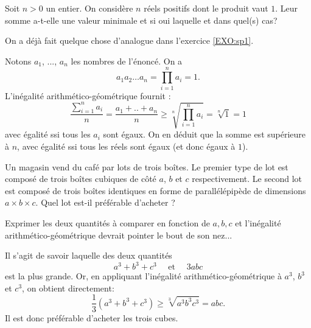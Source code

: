 \begin{exo}
Soit $n>0$ un entier. On considère $n$ réels positifs dont le produit vaut  $1$. Leur somme a-t-elle une valeur minimale et si oui laquelle et dans quel(s) cas?

\begin{hint}
On a déjà fait quelque chose d'analogue dans l'exercice \ref{EXO:sp1}.
\end{hint}
 

\begin{sol}
Notons $a_1$, ..., $a_n$ les nombres de l'énoncé. On a 
\[
a_1 a_2 \dots a_n =  \prod_{i=1}^n a_i=1.\]
L'inégalité arithmético-géométrique fournit :
\[ \frac{\sum_{i=1}^n a_i}{n} = \frac{a_1+..+a_n}{n}\geq \sqrt[n]{\prod_{i=1}^n a_i} = \sqrt[n]{1}=1\]
avec égalité ssi tous les $a_i$ sont égaux. On en déduit que la somme est supérieure à $n$, avec égalité ssi tous les réels sont égaux (et donc égaux à  $1$).
\end{sol}  
\end{exo}

\begin{exo}
Un magasin vend  du café par lots de trois boîtes. Le premier type de lot est composé de trois boîtes cubiques de côté $a$, $b$ et $c$ respectivement. Le second lot est composé de trois boîtes identiques en forme de parallélépipède de dimensions $a\times b \times c$. Quel lot est-il préférable d'acheter ?
 
\begin{hint}
Exprimer les deux quantités à comparer en fonction de $a,b,c$ et l'inégalité arithmético-géométrique devrait pointer le bout de son nez...
\end{hint}

\begin{sol} 
Il s'agit de savoir laquelle des deux quantités
\[ 
a^3+b^3+c^3 \quad 
\text{ et } \quad 
3abc
\]
est la plus grande.
Or, en appliquant l'inégalité arithmético-géométrique à $a^3$, $b^3$ et $c^3$, on obtient directement:
\[
\frac13\left(  a^3+b^3+c^3\right)
\geq 
\sqrt[3]{a^3b^3c^3} = abc.
\]
Il est donc préférable d'acheter les trois cubes.
\end{sol}  
\end{exo}



